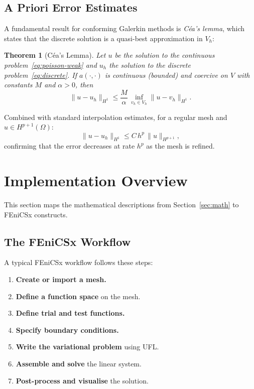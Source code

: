 \documentclass[11pt]{article}
\newtheorem{theorem}{Theorem}[section]
\newcommand{\norm}[1]{\lVert #1 \rVert}
\newcommand{\domain}{\Omega}
\begin{document}
\subsection{A Priori Error Estimates}

A fundamental result for conforming Galerkin methods is \emph{C\'{e}a's lemma},
which states that the discrete solution is a quasi-best approximation in $V_h$:
\begin{theorem}[C\'{e}a's Lemma]
Let $u$ be the solution to the continuous problem~\eqref{eq:poisson-weak}
and $u_h$ the solution to the discrete problem~\eqref{eq:discrete}.
If $a(\cdot,\cdot)$ is continuous (bounded) and coercive on $V$ with
constants $M$ and $\alpha > 0$, then
\begin{equation*}
  \norm{u - u_h}_{H^1} \leq \frac{M}{\alpha}\,
  \inf_{v_h \in V_h} \norm{u - v_h}_{H^1}.
\end{equation*}
\end{theorem}

Combined with standard interpolation estimates, for a regular mesh and
$u \in H^{p+1}(\domain)$:
\begin{equation*}
  \norm{u - u_h}_{H^1} \leq C\, h^p\, \norm{u}_{H^{p+1}},
\end{equation*}
confirming that the error decreases at rate $h^p$ as the mesh is refined.

\section{Implementation Overview}
\label{sec:implementation}

This section maps the mathematical descriptions from Section~\ref{sec:math}
to FEniCSx constructs.

\subsection{The FEniCSx Workflow}

A typical FEniCSx workflow follows these steps:

\begin{enumerate}
  \item \textbf{Create or import a mesh.}
  \item \textbf{Define a function space} on the mesh.
  \item \textbf{Define trial and test functions.}
  \item \textbf{Specify boundary conditions.}
  \item \textbf{Write the variational problem} using UFL.
  \item \textbf{Assemble and solve} the linear system.
  \item \textbf{Post-process and visualise} the solution.
\end{enumerate}
\end{document}
